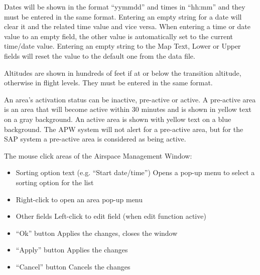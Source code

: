 \documentclass[11pt,a4paper,oldfontcommands]{memoir}
\begin{document}
Dates will be shown in the format “yymmdd” and times in “hh:mm” and they must be entered in the same format. Entering an empty string for a date will clear it and the related time value and vice versa. When entering a time or date value to an empty field, the other value is automatically set to the current time/date value. Entering an empty string to the Map Text, Lower or Upper fields will reset the value to the default one from the data file.

Altitudes are shown in hundreds of feet if at or below the transition altitude, otherwise in flight levels. They must be entered in the same format.

An area’s activation status can be inactive, pre-active or active. A pre-active area is an area that will become active within 30 minutes and is shown in yellow text on a gray background. An active area is shown with yellow text on a blue background. The APW system will not alert for a pre-active area, but for the SAP system a pre-active area is considered as being active.

The mouse click areas of the Airspace Management Window:
\begin{itemize}[\textbullet] 
    \item Sorting option text (e.g. “Start date/time”) Opens a pop-up menu to select a sorting option for the list 
    \item Right-click to open an area pop-up menu
    \item Other fields Left-click to edit field (when edit function active)
    \item “Ok” button Applies the changes, closes the window
    \item “Apply” button Applies the changes
    \item “Cancel” button Cancels the changes 
\end{itemize}
\end{document}
